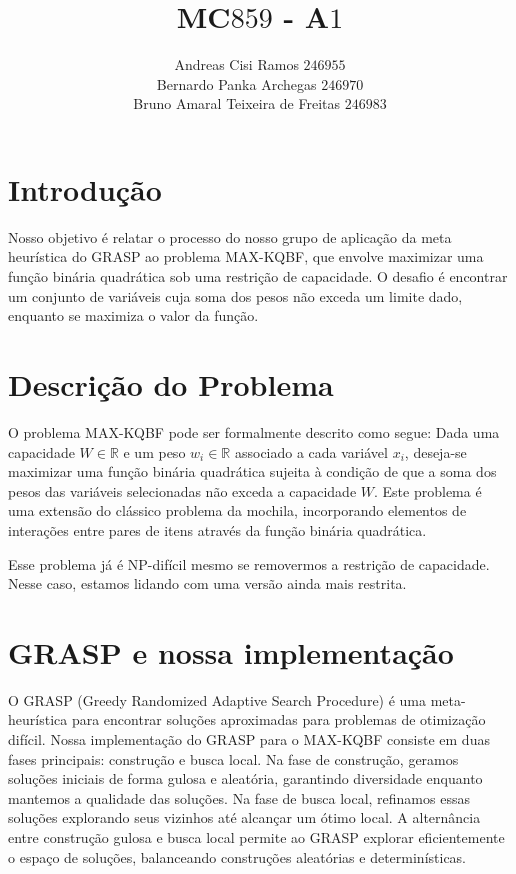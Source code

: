 \documentclass{article}
\title{MC$859$ - A$1$}
\author{Andreas Cisi Ramos $246955$ \\
Bernardo Panka Archegas $246970$ \\
Bruno Amaral Teixeira de Freitas $246983$ \\}
\date{}
\begin{document}
\doublespacing
\maketitle

\section{Introdução}

Nosso objetivo é relatar o processo do nosso grupo de aplicação da meta heurística do GRASP ao problema MAX-KQBF, que envolve maximizar uma função binária quadrática sob uma restrição de capacidade. O desafio é encontrar um conjunto de variáveis cuja soma dos pesos não exceda um limite dado, enquanto se maximiza o valor da função.

\section{Descrição do Problema}

O problema MAX-KQBF pode ser formalmente descrito como segue: Dada uma capacidade $W \in \mathbb{R}$ e um peso $w_i \in \mathbb{R}$ associado a cada variável $x_i$, deseja-se maximizar uma função binária quadrática sujeita à condição de que a soma dos pesos das variáveis selecionadas não exceda a capacidade $W$. Este problema é uma extensão do clássico problema da mochila, incorporando elementos de interações entre pares de itens através da função binária quadrática.

Esse problema já é NP-difícil mesmo se removermos a restrição de capacidade. Nesse caso, estamos lidando com uma versão ainda mais restrita.

\section{GRASP e nossa implementação}

O GRASP (Greedy Randomized Adaptive Search Procedure) é uma meta-heurística para encontrar soluções aproximadas para problemas de otimização difícil. Nossa implementação do GRASP para o MAX-KQBF consiste em duas fases principais: construção e busca local. Na fase de construção, geramos soluções iniciais de forma gulosa e aleatória, garantindo diversidade enquanto mantemos a qualidade das soluções. Na fase de busca local, refinamos essas soluções explorando seus vizinhos até alcançar um ótimo local. A alternância entre construção gulosa e busca local permite ao GRASP explorar eficientemente o espaço de soluções, balanceando construções aleatórias e determinísticas.
\end{document}
